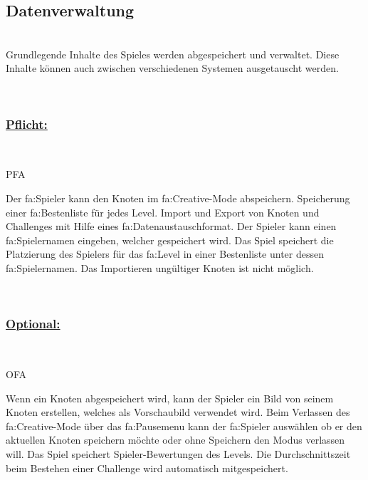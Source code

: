 %
%


\subsection{Datenverwaltung}

%
%
\renewcommand{\K}{}
%
%

~\\
Grundlegende Inhalte des Spieles werden abgespeichert und verwaltet.
Diese Inhalte können auch zwischen verschiedenen Systemen ausgetauscht werden.

~\\

%
%
\subsubsection*{\underline{Pflicht:}}~\\

\begin{ids}{\gls{PFA\K}}

	\id[ 390] Der \gls{fa:Spieler} kann den Knoten im \gls{fa:Creative}-Mode abspeichern.
	\id[ 400]Speicherung einer \gls{fa:Bestenliste} für jedes Level.
	\id[ 410] Import und Export von Knoten und Challenges mit Hilfe eines \gls{fa:Datenaustauschformat}.
	\id[ 420] Der Spieler kann einen \gls{fa:Spielernamen} eingeben, welcher gespeichert wird.
	\id[ 430] Das Spiel speichert die Platzierung des Spielers  für das \gls{fa:Level} in einer \gls{Bestenliste} unter dessen \gls{fa:Spielernamen}.
	\id[ 440] Das Importieren ungültiger Knoten ist nicht möglich.
	
 	
 	
	
\end{ids}

~\\


%
%
\subsubsection*{\underline{Optional:}}~\\


\begin{ids}{\gls{OFA\K}}

	\id[ 450] Wenn ein Knoten abgespeichert wird, kann der Spieler ein Bild von seinem Knoten erstellen, welches als Vorschaubild verwendet wird.
	\id[ 460] Beim Verlassen des \gls{fa:Creative}-Mode über das \gls{fa:Pausemenu}  kann der \gls{fa:Spieler} auswählen ob er den aktuellen Knoten speichern möchte oder ohne Speichern den Modus verlassen will.
	\id[ 470] Das Spiel speichert Spieler-Bewertungen des Levels.
	\id[ 480] Die Durchschnittszeit beim Bestehen einer Challenge wird automatisch mitgespeichert.
	
 	
 	
	
\end{ids}

~\\